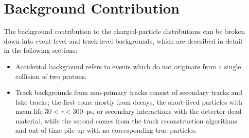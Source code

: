 \chapter{Background Contribution}\label{section:star_background}
The background contribution to the charged-particle distributions can be broken down into
event-level and track-level backgrounds, which are described in detail in the following sections:
\begin{itemize}
	\item Accidental background refers to events which do not originate from a single collision of two protons.
	\item Track backgrounds from non-primary tracks consist of secondary tracks and fake tracks; the first come mostly from decays, the short-lived particles with mean life $30 < \tau < 300$~ps, or secondary interactions with the detector dead material, while the second comes from the track reconstruction algorithms and out-of-time pile-up with
	no corresponding true particles.
\end{itemize}


